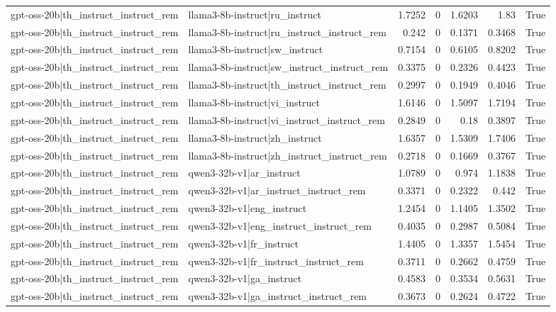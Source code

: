 \begin{table}
\begin{tabular}{l l r r r r l}
gpt-oss-20b|th_instruct_instruct_rem & llama3-8b-instruct|ru_instruct & 1.7252 & 0 & 1.6203 & 1.83 & True \\
gpt-oss-20b|th_instruct_instruct_rem & llama3-8b-instruct|ru_instruct_instruct_rem & 0.242 & 0 & 0.1371 & 0.3468 & True \\
gpt-oss-20b|th_instruct_instruct_rem & llama3-8b-instruct|sw_instruct & 0.7154 & 0 & 0.6105 & 0.8202 & True \\
gpt-oss-20b|th_instruct_instruct_rem & llama3-8b-instruct|sw_instruct_instruct_rem & 0.3375 & 0 & 0.2326 & 0.4423 & True \\
gpt-oss-20b|th_instruct_instruct_rem & llama3-8b-instruct|th_instruct_instruct_rem & 0.2997 & 0 & 0.1949 & 0.4046 & True \\
gpt-oss-20b|th_instruct_instruct_rem & llama3-8b-instruct|vi_instruct & 1.6146 & 0 & 1.5097 & 1.7194 & True \\
gpt-oss-20b|th_instruct_instruct_rem & llama3-8b-instruct|vi_instruct_instruct_rem & 0.2849 & 0 & 0.18 & 0.3897 & True \\
gpt-oss-20b|th_instruct_instruct_rem & llama3-8b-instruct|zh_instruct & 1.6357 & 0 & 1.5309 & 1.7406 & True \\
gpt-oss-20b|th_instruct_instruct_rem & llama3-8b-instruct|zh_instruct_instruct_rem & 0.2718 & 0 & 0.1669 & 0.3767 & True \\
gpt-oss-20b|th_instruct_instruct_rem & qwen3-32b-v1|ar_instruct & 1.0789 & 0 & 0.974 & 1.1838 & True \\
gpt-oss-20b|th_instruct_instruct_rem & qwen3-32b-v1|ar_instruct_instruct_rem & 0.3371 & 0 & 0.2322 & 0.442 & True \\
gpt-oss-20b|th_instruct_instruct_rem & qwen3-32b-v1|eng_instruct & 1.2454 & 0 & 1.1405 & 1.3502 & True \\
gpt-oss-20b|th_instruct_instruct_rem & qwen3-32b-v1|eng_instruct_instruct_rem & 0.4035 & 0 & 0.2987 & 0.5084 & True \\
gpt-oss-20b|th_instruct_instruct_rem & qwen3-32b-v1|fr_instruct & 1.4405 & 0 & 1.3357 & 1.5454 & True \\
gpt-oss-20b|th_instruct_instruct_rem & qwen3-32b-v1|fr_instruct_instruct_rem & 0.3711 & 0 & 0.2662 & 0.4759 & True \\
gpt-oss-20b|th_instruct_instruct_rem & qwen3-32b-v1|ga_instruct & 0.4583 & 0 & 0.3534 & 0.5631 & True \\
gpt-oss-20b|th_instruct_instruct_rem & qwen3-32b-v1|ga_instruct_instruct_rem & 0.3673 & 0 & 0.2624 & 0.4722 & True \\

\end{tabular}
\end{table}
